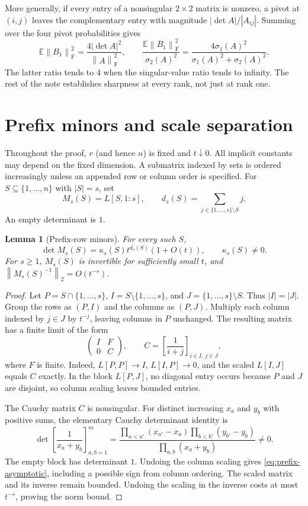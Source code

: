 \documentclass[11pt]{article}
\newtheorem{lemma}[theorem]{Lemma}
\theoremstyle{remark}
\newcommand{\E}{\mathbb E}
\newcommand{\F}{\mathrm F}
\newcommand{\norm}[1]{\left\lVert#1\right\rVert}
\begin{document}
More generally, if every entry of a nonsingular $2\times2$ matrix is nonzero,
a pivot at $(i,j)$ leaves the complementary entry with magnitude
$|\det A|/|A_{ij}|$. Summing over the four pivot probabilities gives
\[
 \E\norm{B_1}_{\F}^2=\frac{4|\det A|^2}{\norm A_{\F}^2},
 \qquad
 \frac{\E\norm{B_1}_{\F}^2}{\sigma_2(A)^2}
 =\frac{4\sigma_1(A)^2}{\sigma_1(A)^2+\sigma_2(A)^2}.
\]
The latter ratio tends to $4$ when the singular-value ratio tends to infinity.
The rest of the note establishes sharpness at every rank, not just at rank one.

\section{Prefix minors and scale separation}

Throughout the proof, $r$ (and hence $n$) is fixed and $t\downarrow0$.
All implicit constants may depend on the fixed dimension. A submatrix indexed
by sets is ordered increasingly unless an appended row or column order is
specified. For $S\subseteq\{1,\ldots,n\}$ with $|S|=s$, set
\[
 M_s(S)=L[S,1\!:\!s],\qquad
 d_s(S)=\sum_{j\in\{1,\ldots,s\}\setminus S}j.
\]
An empty determinant is $1$.

\begin{lemma}[Prefix-row minors]\label{lem:prefix}
For every such $S$,
\begin{equation}\label{eq:prefix-asymptotic}
 \det M_s(S)=\kappa_s(S)t^{d_s(S)}(1+O(t)),
 \qquad \kappa_s(S)\ne0.
\end{equation}
For $s\ge1$, $M_s(S)$ is invertible for sufficiently small $t$, and
$\norm{M_s(S)^{-1}}_2=O(t^{-s})$.
\end{lemma}
\begin{proof}
Let $P=S\cap\{1,\ldots,s\}$, $I=S\setminus\{1,\ldots,s\}$, and
$J=\{1,\ldots,s\}\setminus S$. Thus $|I|=|J|$. Group the rows as $(P,I)$
and the columns as $(P,J)$. Multiply each column indexed by $j\in J$ by
$t^{-j}$, leaving columns in $P$ unchanged. The resulting matrix has a finite
limit of the form
\[
 \begin{pmatrix}I&F\\0&C\end{pmatrix},
 \qquad C=\left[\frac1{i+j}\right]_{i\in I,\,j\in J},
\]
where $F$ is finite. Indeed, $L[P,P]\to I$, $L[I,P]\to0$, and the scaled
$L[I,J]$ equals $C$ exactly. In the block $L[P,J]$, no diagonal entry occurs
because $P$ and $J$ are disjoint, so column scaling leaves bounded entries.

The Cauchy matrix $C$ is nonsingular. For distinct increasing $x_a$ and $y_b$
with positive sums, the elementary Cauchy determinant identity is
\[
 \det\left[\frac1{x_a+y_b}\right]_{a,b=1}^{m}
 =\frac{\prod_{a<a'}(x_{a'}-x_a)\prod_{b<b'}(y_{b'}-y_b)}
 {\prod_{a,b}(x_a+y_b)}\ne0.
\]
The empty block has determinant $1$. Undoing the column scaling gives
\eqref{eq:prefix-asymptotic}, including a possible sign from column ordering.
The scaled matrix and its inverse remain bounded. Undoing the scaling in the
inverse costs at most $t^{-s}$, proving the norm bound.
\end{proof}
\end{document}
